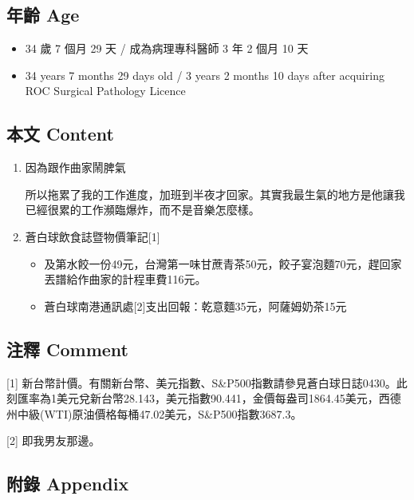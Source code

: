 \documentclass[a5paper, 11pt
]{book}
\providecommand{\tightlist}{%
  \setlength{\itemsep}{0pt}\setlength{\parskip}{0pt}}
\begin{document}
\hypertarget{ux5e74ux9f61-age-21}{%
\subsection{年齡 Age}\label{ux5e74ux9f61-age-21}}

\begin{itemize}
\tightlist
\item
  34 歲 7 個月 29 天 / 成為病理專科醫師 3 年 2 個月 10 天
\item
  34 years 7 months 29 days old / 3 years 2 months 10 days after
  acquiring ROC Surgical Pathology Licence
\end{itemize}

\hypertarget{ux672cux6587-content-21}{%
\subsection{本文 Content}\label{ux672cux6587-content-21}}

\begin{enumerate}
\def\labelenumi{\arabic{enumi}.}
\item
  因為跟作曲家鬧脾氣

  所以拖累了我的工作進度，加班到半夜才回家。其實我最生氣的地方是他讓我已經很累的工作瀕臨爆炸，而不是音樂怎麼樣。
\item
  蒼白球飲食誌暨物價筆記{[}1{]}

  \begin{itemize}
  \tightlist
  \item
    及第水餃一份49元，台灣第一味甘蔗青茶50元，餃子宴泡麵70元，趕回家丟譜給作曲家的計程車費116元。
  \item
    蒼白球南港通訊處{[}2{]}支出回報：乾意麵35元，阿薩姆奶茶15元
  \end{itemize}
\end{enumerate}

\hypertarget{ux6ce8ux91cb-comment-21}{%
\subsection{注釋 Comment}\label{ux6ce8ux91cb-comment-21}}

{[}1{]}
新台幣計價。有關新台幣、美元指數、S\&P500指數請參見蒼白球日誌0430。此刻匯率為1美元兌新台幣28.143，美元指數90.441，金價每盎司1864.45美元，西德州中級(WTI)原油價格每桶47.02美元，S\&P500指數3687.3。

{[}2{]} 即我男友那邊。

\hypertarget{ux9644ux9304-appendix-21}{%
\subsection{附錄 Appendix}\label{ux9644ux9304-appendix-21}}
\end{document}

